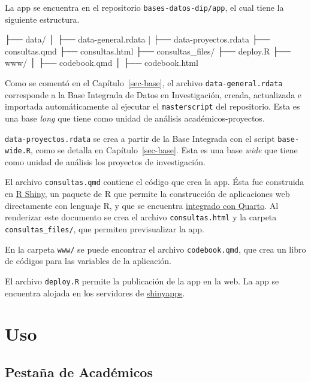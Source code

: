 \documentclass[
  spanish,
  letterpaper,
  DIV=11,
  numbers=noendperiod]{scrreprt}
\newenvironment{Shaded}{\begin{snugshade}}{\end{snugshade}}
\newcommand{\NormalTok}[1]{\textcolor[rgb]{0.00,0.23,0.31}{#1}}
\begin{document}
La app se encuentra en el repositorio \texttt{bases-datos-dip/app}, el
cual tiene la siguiente estructura.

\begin{Shaded}
\begin{Highlighting}[]
\NormalTok{├── data/}
\NormalTok{│   ├── data{-}general.rdata}
\NormalTok{|   ├── data{-}proyectos.rdata}
\NormalTok{├── consultas.qmd}
\NormalTok{├── consultas.html}
\NormalTok{├── consultas\_files/}
\NormalTok{├── deploy.R}
\NormalTok{├── www/}
\NormalTok{│   ├── codebook.qmd}
\NormalTok{│   ├── codebook.html}
\end{Highlighting}
\end{Shaded}

Como se comentó en el Capítulo~\ref{sec-base}, el archivo
\texttt{data-general.rdata} corresponde a la Base Integrada de Datos en
Investigación, creada, actualizada e importada automáticamente al
ejecutar el \texttt{masterscript} del repositorio. Esta es una base
\emph{long} que tiene como unidad de análisis académicos-proyectos.

\texttt{data-proyectos.rdata} se crea a partir de la Base Integrada con
el script \texttt{base-wide.R}, como se detalla en
Capítulo~\ref{sec-base}. Esta es una base \emph{wide} que tiene como
unidad de análisis los proyectos de investigación.

El archivo \texttt{consultas.qmd} contiene el código que crea la app.
Ésta fue construida en
\href{https://shiny.posit.co/r/getstarted/shiny-basics/lesson1/}{R
Shiny}, un paquete de R que permite la construcción de aplicaciones web
directamente con lenguaje R, y que se encuentra
\href{https://quarto.org/docs/interactive/shiny/}{integrado con Quarto}.
Al renderizar este documento se crea el archivo \texttt{consultas.html}
y la carpeta \texttt{consultas\_files/}, que permiten previsualizar la
app.

En la carpeta \texttt{www/} se puede encontrar el archivo
\texttt{codebook.qmd}, que crea un libro de códigos para las variables
de la aplicación.

El archivo \texttt{deploy.R} permite la publicación de la app en la web.
La app se encuentra alojada en los servidores de
\href{https://www.shinyapps.io/}{shinyapps}.

\section{Uso}\label{uso}

\subsection{Pestaña de Académicos}\label{pestauxf1a-de-acaduxe9micos}
\end{document}
